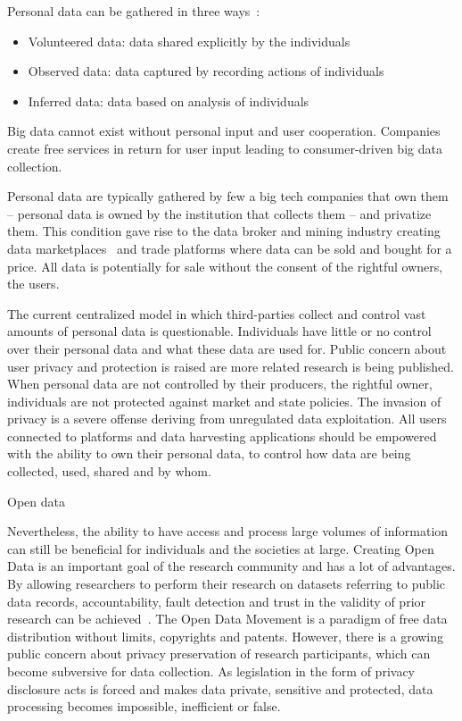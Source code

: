 Personal data can be gathered in three ways~\cite{emergence_new_assets_wef}:

\begin{itemize}
  \item Volunteered data: data shared explicitly by the individuals
  \item Observed data: data captured by recording actions of individuals
  \item Inferred data: data based on analysis of individuals
\end{itemize}

Big data cannot exist without personal input and user cooperation. Companies create free services in return for user input leading to consumer-driven big data collection.

Personal data are typically gathered by few a big tech companies that own them -- personal data is owned by the institution that collects them -- and privatize them. This condition gave rise to the data broker and mining industry creating data marketplaces~\cite{dawex, q_dx, datastreamx} and trade platforms where data can be sold and bought for a price. All data is potentially for sale without the consent of the rightful owners, the users.

The current centralized model in which third-parties collect and control vast amounts of personal data is questionable. Individuals have little or no control over their personal data and what these data are used for. Public concern about user privacy and protection is raised are more related research is being published. When personal data are not controlled by their producers, the rightful owner, individuals are not protected against market and state policies. The invasion of privacy is a severe offense deriving from unregulated data exploitation. All users connected to platforms and data harvesting applications should be empowered with the ability to own their personal data, to control how data are being collected, used, shared and by whom.

Open data

Nevertheless, the ability to have access and process large volumes of information can still be beneficial for individuals and the societies at large. Creating Open Data is an important goal of the research community and has a lot of advantages. By allowing researchers to perform their research on datasets referring to public data records, accountability, fault detection and trust in the validity of prior research can be achieved~\cite{open_data_1}. The Open Data Movement is a paradigm of free data distribution without limits, copyrights and patents. However, there is a growing public concern about privacy preservation of research participants, which can become subversive for data collection. As legislation in the form of privacy disclosure acts is forced and makes data private, sensitive and protected, data processing becomes impossible, inefficient or false.


